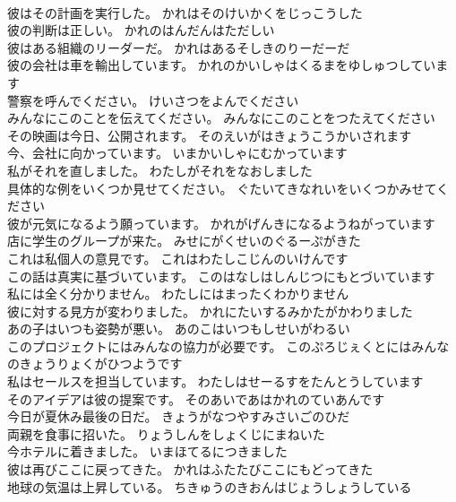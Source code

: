 \documentclass[8pt]{extreport}
\begin{document}
\begin{CJK}{UTF8}{min}
\\	彼はその計画を実行した。	かれはそのけいかくをじっこうした 
\\	彼の判断は正しい。	かれのはんだんはただしい 
\\	彼はある組織のリーダーだ。	かれはあるそしきのりーだーだ 
\\	彼の会社は車を輸出しています。	かれのかいしゃはくるまをゆしゅつしています 
\\	警察を呼んでください。	けいさつをよんでください 
\\	みんなにこのことを伝えてください。	みんなにこのことをつたえてください 
\\	その映画は今日、公開されます。	そのえいがはきょうこうかいされます 
\\	今、会社に向かっています。	いまかいしゃにむかっています 
\\	私がそれを直しました。	わたしがそれをなおしました 
\\	具体的な例をいくつか見せてください。	ぐたいてきなれいをいくつかみせてください 
\\	彼が元気になるよう願っています。	かれがげんきになるようねがっています 
\\	店に学生のグループが来た。	みせにがくせいのぐるーぷがきた 
\\	これは私個人の意見です。	これはわたしこじんのいけんです 
\\	この話は真実に基づいています。	このはなしはしんじつにもとづいています 
\\	私には全く分かりません。	わたしにはまったくわかりません 
\\	彼に対する見方が変わりました。	かれにたいするみかたがかわりました 
\\	あの子はいつも姿勢が悪い。	あのこはいつもしせいがわるい 
\\	このプロジェクトにはみんなの協力が必要です。	このぷろじぇくとにはみんなのきょうりょくがひつようです 
\\	私はセールスを担当しています。	わたしはせーるすをたんとうしています 
\\	そのアイデアは彼の提案です。	そのあいであはかれのていあんです 
\\	今日が夏休み最後の日だ。	きょうがなつやすみさいごのひだ 
\\	両親を食事に招いた。	りょうしんをしょくじにまねいた 
\\	今ホテルに着きました。	いまほてるにつきました 
\\	彼は再びここに戻ってきた。	かれはふたたびここにもどってきた 
\\	地球の気温は上昇している。	ちきゅうのきおんはじょうしょうしている 

\end{CJK}
\end{document}
